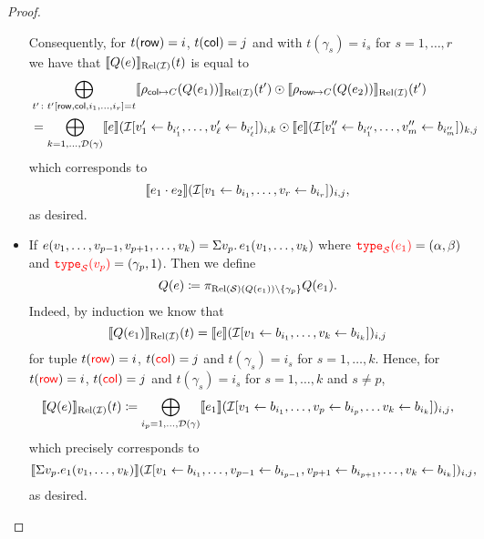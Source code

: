 \begin{proof}
\begin{itemize}
{		Consequently, for $t(\mathsf{row})=i$, $t(\mathsf{col})=j$ and with $t(\gamma_s)=i_s$ for $s=1,\ldots, r$ we have
		that $\llbracket Q(e) \rrbracket_{\text{Rel}(\mathcal{I})}(t)$ is equal to
		\begin{align*}
			&\bigoplus_{t'\colon t'[\mathsf{row},\mathsf{col},i_1,\ldots,i_r]=t} \llbracket \rho_{\mathsf{col}\mapsto C}(Q (e_1)) \rrbracket_{\text{Rel}(\mathcal{I})}(t')\odot \llbracket \rho_{\mathsf{row}\mapsto C}(Q (e_2)) \rrbracket_{\text{Rel}(\mathcal{I})}(t') \\
			&=\bigoplus_{k=1,\ldots,\mathcal{D}(\gamma)} \llbracket e \rrbracket(\mathcal{I}[v_1'\gets b_{i'_1},\ldots,v_\ell'\gets b_{i'_\ell}])_{i,k}\odot \llbracket e \rrbracket(\mathcal{I}[v_1''\gets b_{i''_1},\ldots,v_m''\gets b_{i''_m}])_{k,j}
		\end{align*}
		which corresponds to 
		$$
		\llbracket e_1\cdot e_2 \rrbracket(\mathcal{I}[v_1\gets b_{i_1},\ldots,v_r\gets b_{i_r}])_{i,j},
		$$
		as desired.
		}
  \item If $e(v_1,\ldots,v_{p-1},v_{p+1},\ldots,v_k)=\Sigma v_p. \, e_1(v_1,\ldots,v_k)$ where ${\color{red} \texttt{type}_{\mathcal{S}}(e_1)}=(\alpha,\beta)$ and ${\color{red} \texttt{type}_{\mathcal{S}}(v_p)}=(\gamma_p,1)$. Then we define
		$$
		Q (e)\coloneqq \pi_{\text{Rel}(\mathcal{S})(Q(e_1))\setminus\{\gamma_p\}} Q (e_1).
		$$
		Indeed, by induction we know that 
		$$
		\llbracket Q(e_1) \rrbracket_{\text{Rel}(\mathcal{I})}(t)=\llbracket e \rrbracket(\mathcal{I}[v_1\gets b_{i_1},\ldots,v_k\gets b_{i_k}])_{i,j}
		$$
		for tuple $t({\color{red} \mathsf{row}})=i$, $t({\color{red} \mathsf{col}})=j$ and $t(\gamma_s)=i_s$ for $s=1,\ldots, k$.
		Hence, for $t({\color{red} \mathsf{row}})=i$, $t({\color{red} \mathsf{col}})=j$ and $t(\gamma_s)=i_s$ for $s=1,\ldots, k$ and $s\neq p$,
		$$
		\llbracket Q(e) \rrbracket_{\text{Rel}(\mathcal{I})}(t)\coloneqq \bigoplus_{i_p=1,\ldots,\mathcal{D}(\gamma)} \llbracket e_1 \rrbracket(\mathcal{I}[v_1\gets b_{i_1},\ldots,v_{p}\gets b_{i_p},\ldots v_k\gets b_{i_k}])_{i,j},$$
		which precisely corresponds to 
		$$
		\llbracket \Sigma v_p. e_1(v_1,\ldots,v_k) \rrbracket(\mathcal{I}[v_1\gets b_{i_1},\ldots,v_{p-1}\gets b_{i_{p-1}},v_{p+1}\gets b_{i_{p+1}},\ldots,v_k\gets b_{i_k}])_{i,j},
		$$
as desired.
\end{itemize}
\end{proof}
